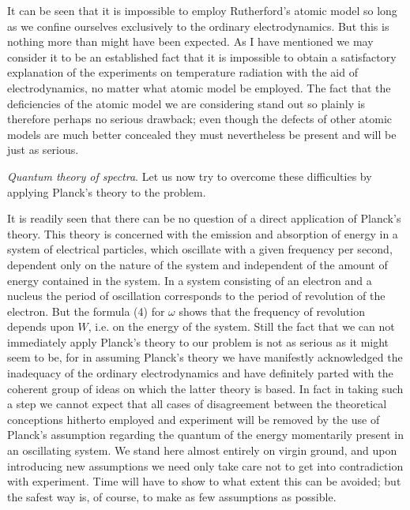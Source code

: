 It can be seen that it is impossible to employ Rutherford's atomic model
so long as we confine ourselves exclusively to the ordinary
electrodynamics. But this is nothing more than might have been expected.
As I have mentioned we may consider it to be an established fact that it
is impossible to obtain a satisfactory explanation of the experiments on
temperature radiation with the aid of electrodynamics, no matter what
atomic model be employed. The fact that the deficiencies of the atomic
model we are considering stand out so plainly is therefore perhaps no
serious drawback; even though the defects of other atomic models are
much better concealed they must nevertheless be present and will be just
as serious.

\emph{Quantum theory of spectra}. Let us now try to overcome these
difficulties by applying Planck's theory to the problem.

It is readily seen that there can be no question of a direct application
of Planck's theory. This theory is concerned with the emission and
absorption of energy in a system of electrical particles, which
oscillate with a given frequency per second, dependent only on the
nature of the system and independent of the amount of energy contained
in the system. In a system consisting of an electron and a nucleus the
period of oscillation corresponds to the period of revolution of the
electron. But the formula (4) for $\omega$ shows that the frequency of
revolution depends upon $W$, i.e. on the energy of the system.
Still the fact that we can not immediately apply Planck's theory to our
problem is not as serious as it might seem to be, for in assuming
Planck's theory we have manifestly acknowledged the inadequacy of the
ordinary electrodynamics and have definitely parted with the coherent
group of ideas on which the latter theory is based. In fact in taking
such a step we cannot expect that all cases of disagreement between the
theoretical conceptions hitherto employed and experiment will be removed
by the use of Planck's assumption regarding the quantum of the energy
momentarily present in an oscillating system. We stand here almost
entirely on virgin ground, and upon introducing new assumptions we need
only take care not to get into contradiction with experiment. Time will
have to show to what extent this can be avoided; but the safest way is,
of course, to make as few assumptions as possible.

